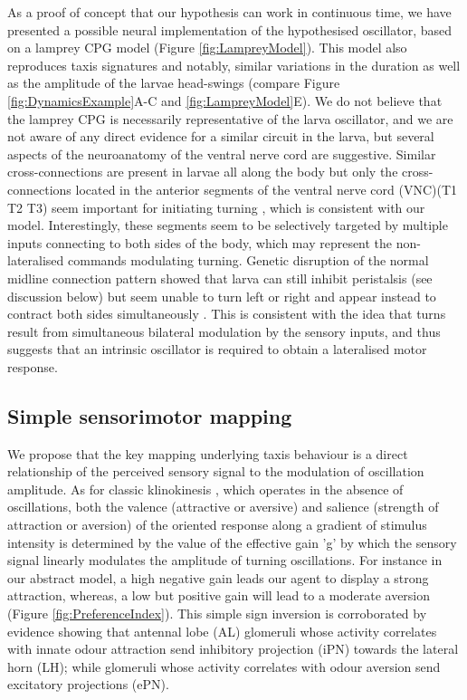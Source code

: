 \documentclass[11pt,a4paper]{article}
\newcommand{\todoBW}[1]{\todo[author=BW,color=orange, size=\tiny,inline]{1}}
\begin{document}
As a proof of concept that our hypothesis can work in continuous time, we have presented a possible neural implementation of the hypothesised oscillator, based on a lamprey CPG model (Figure \ref{fig:LampreyModel}).
 This model also reproduces taxis signatures and notably, similar variations in the duration as well as the amplitude of the larvae head-swings (compare Figure \ref{fig:DynamicsExample}A-C and \ref{fig:LampreyModel}E).
  We do not believe that the lamprey CPG is necessarily representative of the larva oscillator, %
  and we are not aware of any direct evidence for a similar circuit in the larva, but several aspects of the neuroanatomy of the ventral nerve cord are suggestive. Similar cross-connections are present in larvae all along the body \citep{rickert2011morphological}
  but only the cross-connections located in the anterior segments of the ventral nerve cord (VNC)(T1 T2 T3) seem important for initiating turning \citep{ berni2015genetic}, which is consistent with our model. Interestingly, these segments seem to be selectively targeted by multiple inputs connecting to both sides of the body, which may represent the non-lateralised commands modulating turning. Genetic disruption of the normal midline connection pattern showed that larva can still inhibit peristalsis (see discussion below) but seem unable to turn left or right and appear instead to contract both sides simultaneously \citep{berni2015genetic}. This is consistent with the idea that turns result from simultaneous bilateral modulation by the sensory inputs, and thus suggests that an intrinsic oscillator is required to obtain a lateralised motor response.

\subsection{Simple sensorimotor mapping}
We propose that the key mapping underlying taxis behaviour is a direct relationship of the perceived sensory signal to the modulation of oscillation amplitude.
As for classic klinokinesis \citep{benhamou1989animals}, which operates in the absence of oscillations, both the valence (attractive or aversive) and salience (strength of attraction or aversion) of the oriented response along a gradient of stimulus intensity is determined by the value of the effective gain 'g' by which the sensory signal linearly modulates the amplitude of turning oscillations. For instance in our abstract model, a high negative gain leads our agent to display a strong attraction, whereas, a low but positive gain will lead to a moderate aversion (Figure \ref{fig:PreferenceIndex}). This simple sign inversion is corroborated by evidence showing that antennal lobe (AL) glomeruli whose activity correlates with innate odour attraction send inhibitory projection (iPN) towards the lateral horn (LH); while glomeruli whose activity correlates with odour aversion send excitatory projections (ePN). 
\end{document}
